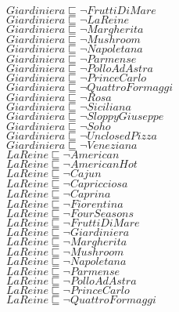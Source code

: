 \documentclass[a4paper,10pt]{article}
\begin{document}
 $Giardiniera \sqsubseteq  \lnot FruttiDiMare$\\ 
 $Giardiniera \sqsubseteq  \lnot LaReine$\\ 
 $Giardiniera \sqsubseteq  \lnot Margherita$\\ 
 $Giardiniera \sqsubseteq  \lnot Mushroom$\\ 
 $Giardiniera \sqsubseteq  \lnot Napoletana$\\ 
 $Giardiniera \sqsubseteq  \lnot Parmense$\\ 
 $Giardiniera \sqsubseteq  \lnot PolloAdAstra$\\ 
 $Giardiniera \sqsubseteq  \lnot PrinceCarlo$\\ 
 $Giardiniera \sqsubseteq  \lnot QuattroFormaggi$\\ 
 $Giardiniera \sqsubseteq  \lnot Rosa$\\ 
 $Giardiniera \sqsubseteq  \lnot Siciliana$\\ 
 $Giardiniera \sqsubseteq  \lnot SloppyGiuseppe$\\ 
 $Giardiniera \sqsubseteq  \lnot Soho$\\ 
 $Giardiniera \sqsubseteq  \lnot UnclosedPizza$\\ 
 $Giardiniera \sqsubseteq  \lnot Veneziana$\\ 
 $LaReine \sqsubseteq  \lnot American$\\ 
 $LaReine \sqsubseteq  \lnot AmericanHot$\\ 
 $LaReine \sqsubseteq  \lnot Cajun$\\ 
 $LaReine \sqsubseteq  \lnot Capricciosa$\\ 
 $LaReine \sqsubseteq  \lnot Caprina$\\ 
 $LaReine \sqsubseteq  \lnot Fiorentina$\\ 
 $LaReine \sqsubseteq  \lnot FourSeasons$\\ 
 $LaReine \sqsubseteq  \lnot FruttiDiMare$\\ 
 $LaReine \sqsubseteq  \lnot Giardiniera$\\ 
 $LaReine \sqsubseteq  \lnot Margherita$\\ 
 $LaReine \sqsubseteq  \lnot Mushroom$\\ 
 $LaReine \sqsubseteq  \lnot Napoletana$\\ 
 $LaReine \sqsubseteq  \lnot Parmense$\\ 
 $LaReine \sqsubseteq  \lnot PolloAdAstra$\\ 
 $LaReine \sqsubseteq  \lnot PrinceCarlo$\\ 
 $LaReine \sqsubseteq  \lnot QuattroFormaggi$\\ 
\end{document}

